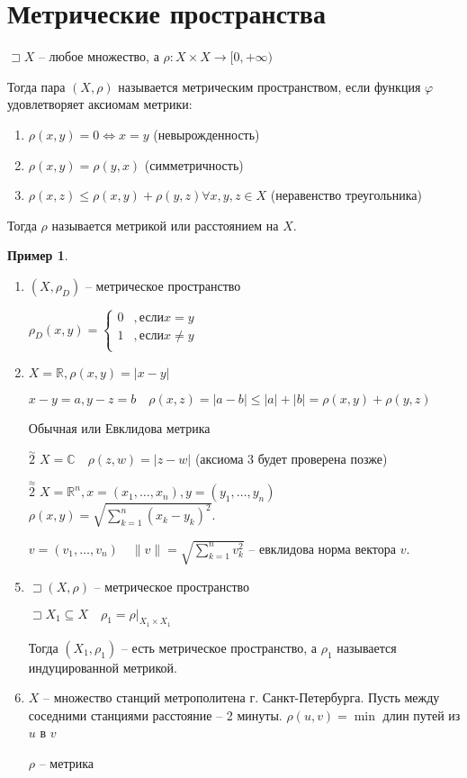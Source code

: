 \documentclass{book}
\newcommand\R{\ensuremath{\mathbb{R}}}
\renewcommand\C{\ensuremath{\mathbb{C}}}
\renewcommand\phi{\varphi}
\theoremstyle{definition}
\newtheorem*{example}{Пример}
\begin{document}
    \section{Метрические пространства}
    \begin{definition}
        $\sqsupset X$ -- любое множество, а $\rho: X\times X \to [0,+\infty )$

        Тогда пара $(X, \rho)$ называется метрическим пространством, если функция $\phi$ удовлетворяет аксиомам метрики:
        \begin{enumerate}
            \item $\rho(x,y) = 0 \iff x = y$ (невырожденность)
            \item $\rho(x,y) = \rho(y,x)$ (симметричность)
            \item $\rho(x,z) \leqslant \rho(x,y) + \rho(y,z) \forall x, y, z\in X$ (неравенство треугольника)
        \end{enumerate}

        Тогда $\rho$ называется метрикой или расстоянием на $X$.
    \end{definition}
    \begin{example}
        \begin{enumerate}
            \item $(X, \rho_{D})$ -- метрическое пространство

            $\rho_D(x,y) = \begin{cases}
                0&, \text{если} x=y\\
                1&, \text{если} x\neq y\\
            \end{cases}$
            \item $X=\R, \rho(x,y) = |x-y|$

            $x-y = a, y-z = b\quad \rho(x,z) = |a-b|\leqslant |a| + |b| = \rho(x,y) + \rho(y,z)$

            Обычная или Евклидова метрика
            \item [$\overset{\sim }2$] $X = \C\quad \rho(z,w) = |z-w|$ (аксиома 3 будет проверена позже)
            \item [$\overset{\approx }{2}$]  $X = \R^n, x = (x_1, \ldots, x_{n} ), y = (y_1, \ldots, y_{n} )$ $\rho(x,y) = \sqrt{\sum_{k=1}^{n} \left( x_k-y_k \right) ^2}$.

            $v = (v_1, \ldots, v_n)\quad \|v\| = \sqrt{\sum_{k=1}^{n} v_k^2} $ -- евклидова норма вектора $v$.
            \item $\sqsupset (X, \rho)$ -- метрическое пространство

            $\sqsupset X_1\subseteq X\quad \rho_1 = \rho|_{X_1\times X_1}$

            Тогда $(X_1, \rho_1)$ -- есть метрическое пространство, а $\rho_1$ называется индуцированной метрикой.
            \item $X$ -- множество станций метрополитена г. Санкт-Петербурга.
            Пусть между соседними станциями расстояние -- 2 минуты. $\rho(u,v) = \min$ длин путей из $u$ в $v$

            $\rho$ -- метрика
        \end{enumerate}
    \end{example}
\end{document}

